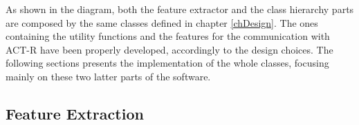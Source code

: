 	As shown in the diagram, both the feature extractor and the class hierarchy parts are composed by the same classes defined in chapter \ref{chDesign}. 
	The ones containing the utility functions and the features for the communication with \mbox{ACT-R} have been properly developed, accordingly to the design choices.
	The following sections presents the implementation of the whole classes, focusing mainly on these two latter parts of the software. 

	\subsection{Feature Extraction}
	
		\begin{figure}[h]
		  \begin{center} 
		  \end{center} 
		  \caption{\textit{}}  
		  \label{fig:extraction and client server}
	 	\end{figure}	


